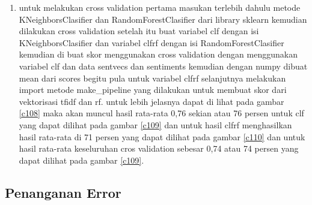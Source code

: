 \begin{enumerate}
\item untuk melakukan cross validation pertama masukan terlebih dahulu metode KNeighborsClasifier dan RandomForestClasifier dari library sklearn kemudian dilakukan cross validation setelah itu buat variabel clf dengan isi KNeighborsClasifier dan variabel clfrf dengan isi RandomForestClasifier kemudian di buat skor menggunakan cross validation dengan menggunakan variabel clf dan data sentvecs dan sentiments kemudian dengan numpy dibuat mean dari scores begitu pula untuk variabel clfrf selanjutnya melakukan import metode make\_pipeline yang dilakukan untuk membuat skor dari vektorisasi tfidf dan rf. untuk lebih jelasnya dapat di lihat pada gambar \ref{c108}  maka akan muncul hasil rata-rata 0,76 sekian atau 76 persen untuk clf yang dapat dilihat pada gambar \ref{c109} dan untuk hasil clfrf menghasilkan hasil rata-rata di 71 persen yang dapat dilihat pada gambar \ref{c110} dan untuk hasil rata-rata keseluruhan cros validation sebesar 0,74 atau 74 persen yang dapat dilihat pada gambar \ref{c109}.


\end{enumerate}
\subsection{Penanganan Error}
